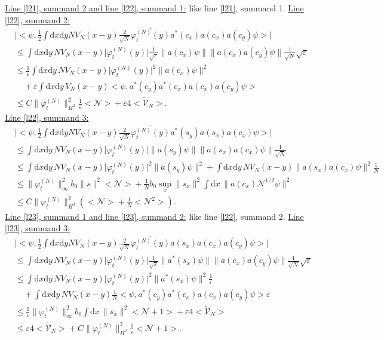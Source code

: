 \documentclass[11pt,a4paper,draft,DIV11]{scrartcl}	%
\newcommand{\di}{\textrm{d}}		%
\newcommand{\Ncal}{\mathcal{N}}		%
\newcommand{\tilV}{\tilde{\mathcal{V}}_N}		%
\newcommand{\estlist}[2]{\underline{Line \ref{l#1}, summand #2:}}
\newcommand{\nestlist}[2]{line \ref{l#1}, summand #2}
\newcommand{\Nestlist}[2]{Line \ref{l#1}, summand #2}
\newcommand{\scal}[2]{\big<#1,#2\big>} %
\newcommand{\cc}[1]{\overline{#1}}	%
\newcommand{\norm}[1]{\lVert#1\rVert}	%
\newcommand{\ev}[1]{\big<#1\big>}	%
\newcommand{\ph}{\varphi_t^{(N)}}	%
\newcommand{\dxyNV}{\frac{1}{2}\int \di x\di y N V_N(x-y)} %
\begin{document}
\underline{\Nestlist{21}{2} and \nestlist{22}{1}:} like \nestlist{21}{1}.\newline
\estlist{22}{2}
\begin{align*}
 & \lvert \scal{\psi}{\dxyNV \frac{2}{\sqrt{N}}\cc{\ph(y)} a^\ast(c_x)a(c_x)a(c_y)\psi} \rvert \\
& \leq \int \di x\di y\, NV_N(x-y) \lvert \ph(y)\rvert \frac{1}{\sqrt{\varepsilon}} \norm{a(c_x)\psi} \norm{a(c_x)a(c_y)\psi} \frac{1}{\sqrt{N}}\sqrt{\varepsilon} \\
& \leq \frac{1}{\varepsilon}\int \di x\di y\, NV_N(x-y) \lvert \ph(y)\rvert^2
  \norm{a(c_x)\psi}^2 \\
& \quad  + \varepsilon \int \di x\di y\, V_N(x-y) \scal{\psi}{a^\ast(c_y)a^\ast(c_x)a(c_x)a(c_y) \psi} \\
& \leq C\norm{\ph}_{H^2}^2 \frac{1}{\varepsilon}\ev{\Ncal} + \varepsilon 4\ev{\tilV}.
\end{align*}
\estlist{22}{3}
\begin{align*}
& \lvert \scal{\psi}{\dxyNV \frac{2}{\sqrt{N}} \cc{\ph(y)}a^\ast(s_y)a(s_x)a(c_x)\psi} \rvert \\
& \leq \int \di x\di y\, NV_N(x-y) \lvert \ph(y)\rvert \norm{a(s_y)\psi} \norm{a(s_x)a(c_x)\psi}\frac{1}{\sqrt{N}} \\
& \leq \int \di x \di y\, NV_N(x-y) \lvert\ph(y)\rvert^2 \norm{a(s_y)\psi}^2 + \int \di x\di y\, NV_N(x-y) \norm{a(s_x)a(c_x)\psi}^2 \frac{1}{N} \\
& \leq \norm{\ph}_\infty^2 b_0 \norm{s}^2 \ev{\Ncal} + \frac{1}{N}b_0 \sup_x\norm{s_x}^2 \int \di x\, \norm{a(c_x)\Ncal^{1/2}\psi}^2 \\
& \leq C \norm{\ph}_{H^2}^2 \left( \ev{\Ncal} + \frac{1}{N}\ev{\Ncal^2}\right). 
\end{align*}
\underline{\Nestlist{23}{1} and \nestlist{23}{2}:} %
like \nestlist{22}{2}.\newline
\estlist{23}{3}
\begin{align*}
& \lvert \scal{\psi}{\dxyNV \frac{2}{\sqrt{N}} \cc{\ph(y)} a(s_x) a(c_x) a(c_y)\psi} \rvert \\
& \leq \int \di x\di y\, NV_N(x-y) \lvert \ph(y)\rvert \frac{1}{\sqrt{\varepsilon}} \norm{a^\ast(s_x)\psi} \norm{a(c_x)a(c_y)\psi}\frac{1}{\sqrt{N}}\sqrt{\varepsilon} \\
& \leq \int \di x\di y\, NV_N(x-y) \lvert \ph(y)\rvert^2
  \norm{a^\ast(s_x)\psi}^2\frac{1}{\varepsilon} \\
& \quad + \int \di x\di y\, NV_N(x-y) \frac{1}{N} \scal{\psi}{a^\ast(c_y)a^\ast(c_x)a(c_x)a(c_y)\psi}\varepsilon \\
& \leq \frac{1}{\varepsilon} \norm{\ph}_\infty^2 b_0 \int \di x\, \norm{s_x}^2 \ev{\Ncal+1} + \varepsilon 4 \ev{\tilV}\\
& \leq \varepsilon 4 \ev{\tilV} + C\norm{\ph}_{H^2}^2 \frac{1}{\varepsilon}\ev{\Ncal+1}.
\end{align*}
\end{document}
